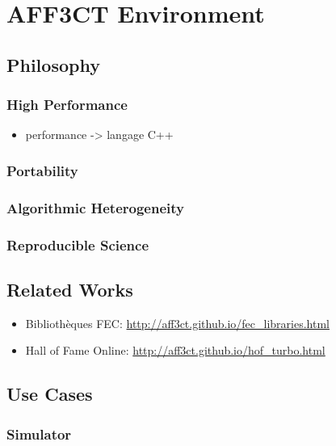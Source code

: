 \graphicspath{{main/chapter4/fig/}}

\chapter{AFF3CT Environment}

\section{Philosophy~\cite{Cassagne2019a}}

\subsection{High Performance}

\begin{itemize}
  \item performance -> langage C++
\end{itemize}

\subsection{Portability}

\subsection{Algorithmic Heterogeneity}

\subsection{Reproducible Science}

\section{Related Works}

\begin{itemize}
  \item Bibliothèques FEC: \url{http://aff3ct.github.io/fec_libraries.html}
  \item Hall of Fame Online: \url{http://aff3ct.github.io/hof_turbo.html}
\end{itemize}

\section{Use Cases}

\subsection{Simulator~\cite{Cassagne2017,Cassagne2017a}}

